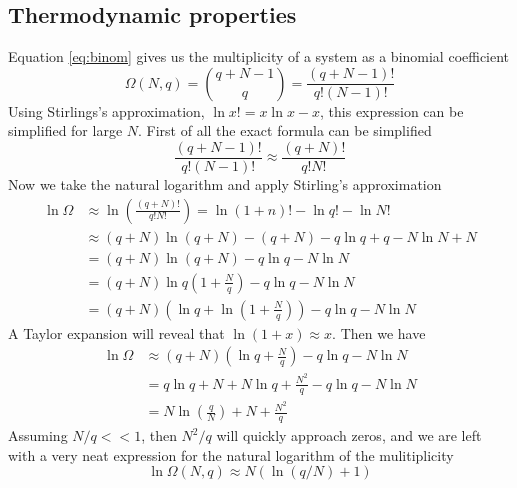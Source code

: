 \documentclass[10pt,a4paper]{amsart}
\begin{document}
\subsection{Thermodynamic properties}
Equation \ref{eq:binom} gives us the multiplicity of a system as a binomial coefficient
\begin{equation*}
\Omega(N,q)=\binom{q+N-1}{q}=\frac{(q+N-1)!}{q!(N-1)!}
\end{equation*}
Using Stirlings's approximation, $\ln x!=x\ln x-x$, this expression can be simplified for large $N$. First of all the exact formula can be simplified
\begin{equation}
\frac{(q+N-1)!}{q!(N-1)!} \approx \frac{(q+N)!}{q!N!}
\end{equation}
Now we take the natural logarithm and apply Stirling's approximation
\begin{align}
\ln \Omega &\approx \ln \left(\frac{(q+N)!}{q!N!}\right) = \ln (1+n)! - \ln q! - \ln N! \\
& \approx (q+N)\ln (q+N)-(q+N) - q \ln q +q - N \ln N +N \\
&= (q+N) \ln (q+N) - q \ln q - N \ln N \\
&= (q+N) \ln q(1+\frac{N}{q}) - q \ln q - N \ln N \\                                                                                                                                                                                                                                                                                                                                                                                                       
&= (q+N) (\ln q + \ln(1+\frac{N}{q})) - q \ln q - N \ln N                                                                                                                                                                                                                                                                                                                                                                                                       
\end{align}
A Taylor expansion will reveal that $\ln (1+x) \approx x$. Then we have
\begin{align*}
\ln \Omega &\approx (q+N) (\ln q + \frac{N}{q}) - q \ln q - N \ln N\\
&= q\ln q + N + N \ln q + \frac{N^2}{q} - q\ln q - N\ln N \\
&= N \ln \left(\frac{q}{N}\right) +N + \frac{N^2}{q} 
\end{align*}
Assuming $N/q << 1$, then $N^2/q$ will quickly approach zeros, and we are left with a very neat expression for the natural logarithm of the mulitiplicity
\begin{equation}
\label{eq:lnmulti}
\ln \Omega (N,q) \approx N(\ln (q/N) +1)
\end{equation}
\end{document}
